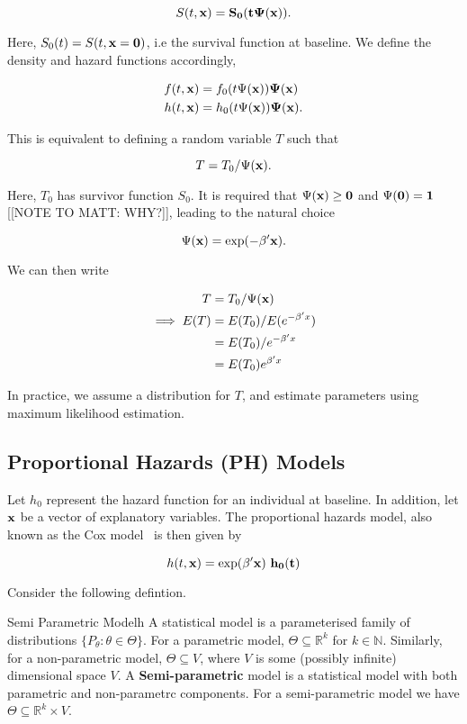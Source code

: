 \[
    S(t, \bf{x}) = S_0(t\Psi(\bf{x})).
\]

Here, $S_0(t) = S(t, \bf{x} = \bf{0})$, i.e the survival function at baseline. We define the density and hazard functions accordingly,

\begin{align*}
    f(t, \bf{x}) &= f_0(t\Psi(\bf{x}))\Psi(\bf{x}) \\
    h(t, \bf{x}) &= h_0(t\Psi(\bf{x}))\Psi(\bf{x}).
\end{align*}

This is equivalent to defining a random variable $T$ such that

\[
    T = T_0/\Psi(\bf{x}).  
\]

Here, $T_0$ has survivor function $S_0$. It is required that $\Psi(\bf{x}) \geq 0$ and $\Psi(\bf{0}) = 1$ [[NOTE TO MATT: WHY?]], leading to the natural choice 

\[
    \Psi(\bf{x}) = \exp(-\beta'x).  
\]

We can then write 

\begin{align*}
    T &= T_0/\Psi(\bf{x}) \\
    \implies E(T) &= E(T_0)/E(e^{-\beta'x}) \\
    &= E(T_0)/e^{-\beta'x} \\
    &= E(T_0)e^{\beta'x}
\end{align*}

In practice, we assume a distribution for $T$, and estimate parameters using maximum likelihood estimation. 

\subsection{Proportional Hazards (PH) Models}

Let $h_0$ represent the hazard function for an individual at baseline. In addition, let $\bf{x}$ be a vector of explanatory variables. The proportional hazards model, also known as the Cox model~\cite{cox1972} is then given by 

\begin{equation}
    h(t, \bf{x}) = \exp(\beta'\bf{x}) \ h_0(t)
    \label{coxmodel}
\end{equation}

Consider the following defintion.

\begin{definition}{Semi Parametric Model}{h}
    A statistical model is a parameterised family of distributions $\{P_{\theta} : \theta \in \Theta\}$. 
    For a parametric model, $\Theta \subseteq \mathbb{R}^k$ for $k \in \mathbb{N}$. Similarly, for a non-parametric model, $\Theta \subseteq V$, where $V$ is some (possibly infinite) dimensional space $V$. A \textbf{Semi-parametric} model is a statistical model with both parametric and non-parametrc components. For a semi-parametric model we have $\Theta \subseteq \mathbb{R}^k \times V$.
\end{definition}

